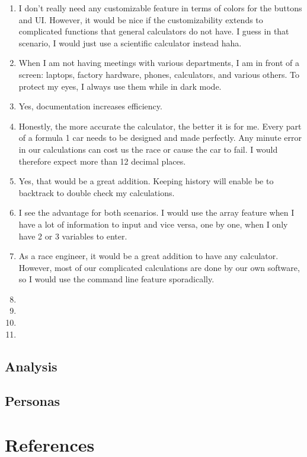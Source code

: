 \documentclass[titlepage]{article}
\begin{document}
\begin{itemize}
\begin{enumerate}
                            \item I don’t really need any customizable feature in terms of colors for the buttons and UI. However, it would be nice if the customizability extends to complicated functions that general calculators do not have. I guess in that scenario, I would just use a scientific calculator instead haha.
                            \item When I am not having meetings with various departments, I am in front of a screen:  laptops, factory hardware, phones, calculators, and various others. To protect my eyes, I always use them while in dark mode.
                            \item Yes, documentation increases efficiency.
                            \item Honestly, the more accurate the calculator, the better it is for me. Every part of a formula 1 car needs to be designed and made perfectly. Any minute error in our calculations can cost us the race or cause the car to fail. I would therefore expect more than 12 decimal places.
                            \item Yes, that would be a great addition. Keeping history will enable be to backtrack to double check my calculations.
                            \item I see the advantage for both scenarios. I would use the array feature when I have a lot of information to input and vice versa, one by one, when I only have 2 or 3 variables to enter.
                            \item As a race engineer, it would be a great addition to have any calculator. However, most of our complicated calculations are done by our own software, so I would use the command line feature sporadically.
                            \item
                            \item
                            \item
                            \item
                        \end{enumerate}
                \end{itemize}

        \subsection{Analysis}
            \blindtext

        \subsection{Personas}
            \blindtext

\section{References}


\end{document}
